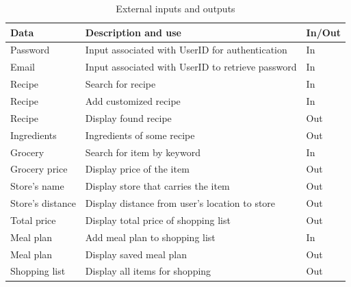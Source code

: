 \begin{table}[H]
\centering
\begin{tabular}{|l|l|l|}
\hline
\textbf {Data}      & \textbf{Description and use}  & \textbf{In/Out} \\
\hline
Password & Input associated with UserID for authentication & In       \\
\hline
Email & Input associated with UserID to retrieve password & In      \\
\hline
Recipe & Search for recipe  & In       \\
\hline
Recipe & Add customized recipe  & In       \\
\hline
Recipe & Display found recipe  & Out       \\
\hline
Ingredients & Ingredients of some recipe & Out       \\
\hline
Grocery & Search for item by keyword  & In     \\
\hline
Grocery price & Display price of the item & Out          \\
\hline
Store's name & Display store that carries the item & Out       \\
\hline
Store's distance & Display distance from user's location to store & Out \\
\hline
Total price & Display total price of shopping list & Out \\
\hline
Meal plan &  Add meal plan to shopping list & In       \\
\hline
Meal plan &  Display saved meal plan  & Out       \\
\hline
Shopping list & Display all items for shopping & Out        \\
\hline
\end{tabular}
\caption{External inputs and outputs}
\end{table}


